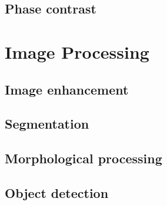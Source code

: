 \subsection{Phase contrast}

\section{Image Processing}
\subsection{Image enhancement}
\subsection{Segmentation}
\subsection{Morphological processing}
\subsection{Object detection}
